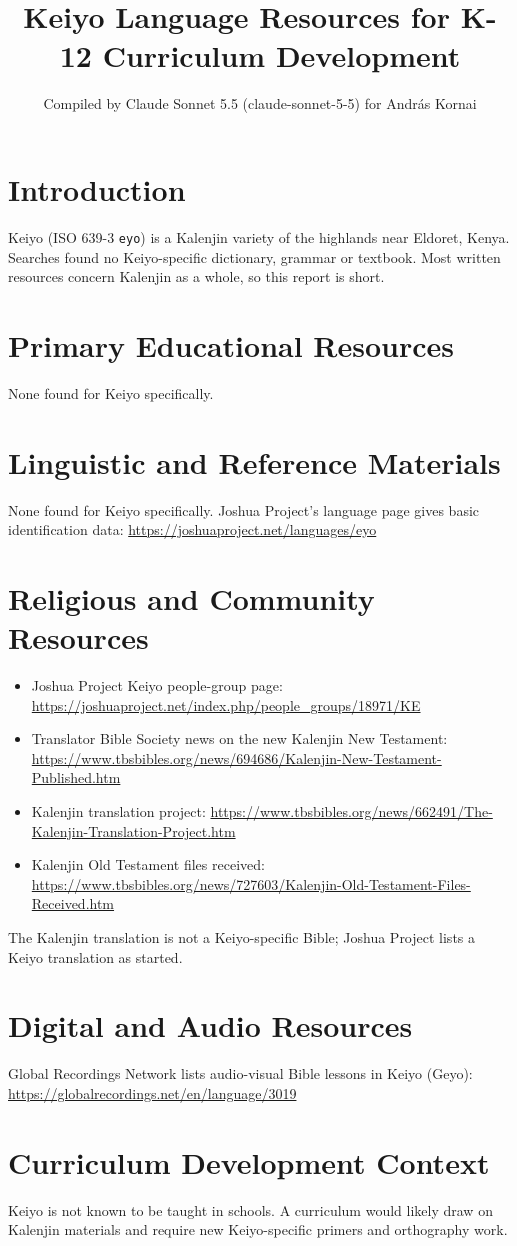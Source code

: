 \documentclass[12pt]{article}
\title{Keiyo Language Resources for K-12 Curriculum Development}
\author{Compiled by Claude Sonnet 5.5 (claude-sonnet-5-5) for Andr\'as Kornai}
\date{}
\begin{document}
\maketitle

\section{Introduction}
Keiyo (ISO 639-3 \texttt{eyo}) is a Kalenjin variety of the highlands near Eldoret, Kenya. Searches found no Keiyo-specific dictionary, grammar or textbook. Most written resources concern Kalenjin as a whole, so this report is short.

\section{Primary Educational Resources}
None found for Keiyo specifically.

\section{Linguistic and Reference Materials}
None found for Keiyo specifically. Joshua Project's language page gives basic identification data: \url{https://joshuaproject.net/languages/eyo}

\section{Religious and Community Resources}
\begin{itemize}
\item Joshua Project Keiyo people-group page: \url{https://joshuaproject.net/index.php/people_groups/18971/KE}
\item Translator Bible Society news on the new Kalenjin New Testament: \url{https://www.tbsbibles.org/news/694686/Kalenjin-New-Testament-Published.htm}
\item Kalenjin translation project: \url{https://www.tbsbibles.org/news/662491/The-Kalenjin-Translation-Project.htm}
\item Kalenjin Old Testament files received: \url{https://www.tbsbibles.org/news/727603/Kalenjin-Old-Testament-Files-Received.htm}
\end{itemize}
The Kalenjin translation is not a Keiyo-specific Bible; Joshua Project lists a Keiyo translation as started.

\section{Digital and Audio Resources}
Global Recordings Network lists audio-visual Bible lessons in Keiyo (Geyo): \url{https://globalrecordings.net/en/language/3019}

\section{Curriculum Development Context}
Keiyo is not known to be taught in schools. A curriculum would likely draw on Kalenjin materials and require new Keiyo-specific primers and orthography work.
\end{document}
